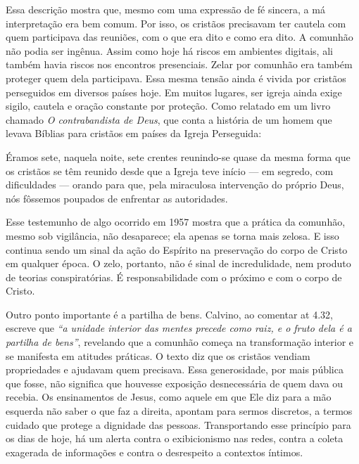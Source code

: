 Essa descrição mostra que, mesmo com uma expressão de fé sincera, a má interpretação era bem comum. Por isso, os cristãos precisavam ter cautela com quem participava das reuniões, com o que era dito e como era dito. A comunhão não podia ser ingênua. Assim como hoje há riscos em ambientes digitais, ali também havia riscos nos encontros presenciais. Zelar por comunhão era também proteger quem dela participava. Essa mesma tensão ainda é vivida por cristãos perseguidos em diversos países hoje. Em muitos lugares, ser igreja ainda exige sigilo, cautela e oração constante por proteção. Como relatado em um livro chamado \textit{O contrabandista de Deus}, que conta a história de um homem que levava Bíblias para cristãos em países da Igreja Perseguida:

\begin{citacao}
    Éramos sete, naquela noite, sete crentes reunindo-se quase da mesma forma que os cristãos se têm reunido desde que a Igreja teve início — em segredo, com dificuldades — orando para que, pela miraculosa intervenção do próprio Deus, nós fôssemos poupados de enfrentar as autoridades. \cite[p.~166]{brotherAndrew}
\end{citacao}

Esse testemunho de algo ocorrido em 1957 mostra que a prática da comunhão, mesmo sob vigilância, não desaparece; ela apenas se torna mais zelosa. E isso continua sendo um sinal da ação do Espírito na preservação do corpo de Cristo em qualquer época. O zelo, portanto, não é sinal de incredulidade, nem produto de teorias conspiratórias. É responsabilidade com o próximo e com o corpo de Cristo.

Outro ponto importante é a partilha de bens. Calvino, ao comentar \gls{at} 4.32, escreve que \textit{``a unidade interior das mentes precede como raiz, e o fruto dela é a partilha de bens''}\cite{calvinoAtos4}, revelando que a comunhão começa na transformação interior e se manifesta em atitudes práticas. O texto diz que os cristãos vendiam propriedades e ajudavam quem precisava. Essa generosidade, por mais pública que fosse, não significa que houvesse exposição desnecessária de quem dava ou recebia. Os ensinamentos de Jesus, como aquele em que Ele diz para a mão esquerda não saber o que faz a direita, apontam para sermos discretos, a termos cuidado que protege a dignidade das pessoas. Transportando esse princípio para os dias de hoje, há um alerta contra o exibicionismo nas redes, contra a coleta exagerada de informações e contra o desrespeito a contextos íntimos.

